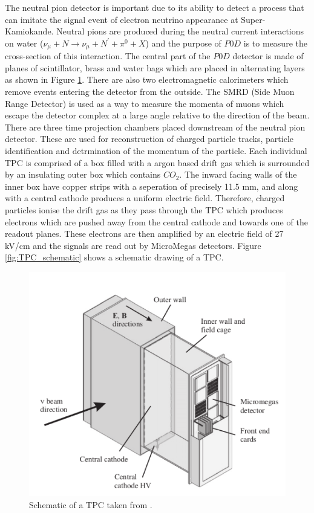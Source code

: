 The neutral pion detector is important due to its ability to detect a process that can imitate the signal event of electron neutrino appearance at Super-Kamiokande. Neutral pions are produced during the neutral current interactions on water ($\nu_{\mu} + N \rightarrow \nu_{\mu} + N^{'} +\pi^{0} + X$) and the purpose of $P0D$ is to measure the cross-section of this interaction. The central part of the $P0D$ detector is made of planes of scintillator, brass and water bags which are placed in alternating layers as shown in Figure \ref{fig:p0d}. There are also two electromagnetic calorimeters which remove events entering the detector from the outside. The SMRD (Side Muon Range Detector) is used as a way to measure the momenta of muons which escape the detector complex at a large angle relative to the direction of the beam. There are three time projection chambers placed downstream of the neutral pion detector. These are used for reconstruction of charged particle tracks, particle identification and detrmination of the momentum of the particle. Each individual TPC is comprised of a box filled with a argon based drift gas which is surrounded by an insulating outer box which contains $CO_{2}$. The inward facing walls of the inner box have copper strips with a seperation of precisely 11.5 mm, and along with a central cathode produces a uniform electric field. Therefore, charged particles ionise the drift gas as they pass through the TPC which produces electrons which are pushed away from the central cathode and towards one of the readout planes. These electrons are then amplified by an electric field of 27 kV/cm and the signals are read out by MicroMegas detectors. Figure \ref{fig:TPC_schematic} shows a schematic drawing of a TPC.

\begin{figure}
    \includegraphics[width=\textwidth]{Figures/tpc_schematic.png}
    \caption{Schematic of a TPC taken from \cite{t2kcollaborationT2KExperiment2011}.}
\label{fig:p0d}
\end{figure}

